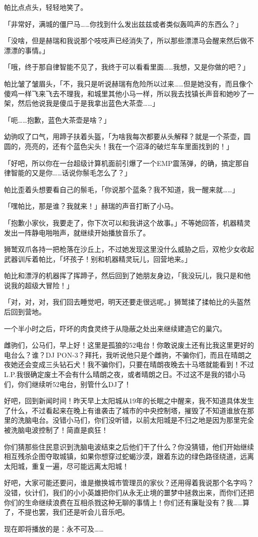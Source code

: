 帕比点点头，轻轻地笑了。

「非常好，满城的僵尸马……你找到什么发出兹兹或者类似轰鸣声的东西么？」

「没啥，但是赫瑞和我说那个吱吱声已经消失了，所以那些漂漂马会醒来然后做不漂漂的事情。」

「哦，终于那自律智能不见了，我终于可以看看里面……我想，又是你做的吧？」

帕比皱了皱眉头，「不，我只是听说赫瑞有危险所以过来……但是她没有，而且像个傻鸡一样飞来飞去不理我，和城里其他小马一样，所以我去找镇长声音和她吵了一架，然后他说我是傻瓜于是我拿出蓝色大茶壶……」

「呃……抱歉，蓝色大茶壶是啥？」

幼驹叹了口气，用蹄子扶着头盔，「为啥我每次都要从头解释？就是一个茶壶，圆圆的，亮亮的，还有个蓝色尖头！我在一个沼泽的破烂车车里面找到的！」

「好吧，所以你在一台超级计算机面前引爆了一个EMP震荡弹，的确，搞定那自律智能的又是你……话说你鬃毛怎么了？」

帕比歪着头想要看自己的鬃毛，「你说那个蓝条？我不知道，我一醒来就……」

「嘿帕比，那是谁？我就来！」赫瑞的声音打断了小马。

「抱歉小家伙，我要走了，你下次可以和我讲这个故事。」不等她回答，机器精灵发出一阵静电啪啪声，就继续开始播放音乐了。

狮鹫双爪各持一把枪落在沙丘上，不过她发现这里没什么威胁之后，双枪少女收起武器训斥着帕比，「坏孩子！别和机器精灵玩儿，回营地来。」

帕比和漂浮的机器挥了挥蹄子，然后回到了她朋友身边，「我没玩儿，我只是和他说我的超级大冒险！」

「对，对，对，我们回去睡觉吧，明天还要走很远呢。」狮鹫揉了揉帕比的头盔然后回到营地。

一个半小时之后，吓坏的肉食灵终于从隐蔽之处出来继续建造它的巢穴。

\horizonline

{\rt 雌驹们，公马们，早上好！这里是孤狼的52电台！你敢说废土还有比我这里更好的电台么？谁？DJ PON-3？拜托，我听说他只是个雌驹，不骗你们，而且在晴朗之夜她还会变成三头钻石犬！我不骗你们，只要在晴朗夜晚去十马塔就能看到！不过L.P.我很确定废土不会有什么晴朗之夜，或者晴朗之日。不过这不是我的错小马们，你们继续听52电台，别管什么DJ了！

好吧，回到新闻时间！昨天早上太阳城从19年的长眠之中醒来，我不知道具体发生了什么，不过看起来在晚上有谁袭击了城市的中央控制塔，摧毁了不知道谁放在那里的洗脑电台。没错小马们，你们没听错，以前太阳城是不归之地是因为那里完全被洗脑电波控制了！简直是疯狂！

你们猜那些住民意识到洗脑电波结束之后他们干了什么？你没猜错，他们开始继续相互残杀企图夺取城镇，如果你想穿过蛇蝎沙漠，跟着东边的绿色路径绕道，远离太阳城，重复一遍，尽可能远离太阳城！

好吧，大家可能还要问，谁是撤换城市管理员的家伙？还用得着我说那个名字吗？没错，伙计们，我们的小小英雄把你们从永无止境的噩梦中拯救出来，而你们还把你们的生命继续浪费在互相杀戮这种无聊的事情上！你们还有廉耻没有？我……算了，不提也罢，我们还是听会儿音乐吧。

现在即将播放的是：永不可及……}

